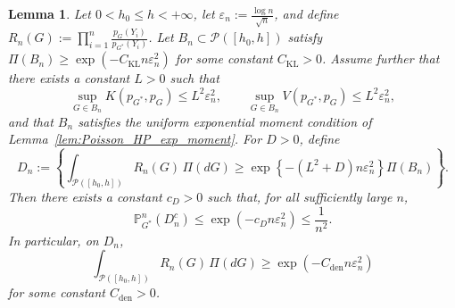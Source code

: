\documentclass[twoside,12pt]{article}
\renewcommand{\P}{\mathds{P}}
\newtheorem{lem}[thm]{Lemma}
\begin{document}
\begin{lem}\label{lem:Poisson_HP_Dn}
Let $0<h_0\le h<+\infty$, let $\varepsilon_n:=\frac{\log n}{\sqrt n}$, and define $R_n(G):=\prod_{i=1}^n \frac{p_G(Y_i)}{p_{G^\ast}(Y_i)}$. Let $B_n\subset \mathcal P([h_{0},h])$ satisfy $\Pi(B_n)\ge \exp(-C_{\mathrm{KL}}n\varepsilon_n^2)$ for some constant $C_{\mathrm{KL}}>0$. Assume further that there exists a constant $L>0$ such that
\begin{displaymath}
\sup_{G\in B_n}K(p_{G^\ast},p_G)\le L^2\varepsilon_n^2,\qquad\sup_{G\in B_n}V(p_{G^\ast},p_G)\le L^2\varepsilon_n^2,
\end{displaymath}
and that $B_n$ satisfies the uniform exponential moment condition of Lemma~\ref{lem:Poisson_HP_exp_moment}. For $D>0$, define
\begin{displaymath}
D_n:=\left\{\int_{\mathcal P([h_{0},h])} R_n(G)\,\Pi(dG)\ge\exp\!\left\{-(L^2+D)n\varepsilon_n^2\right\}\Pi(B_n)\right\}.
\end{displaymath}
Then there exists a constant $c_D>0$ such that, for all sufficiently large $n$,
\begin{displaymath}
\P_{G^\ast}^n(D_n^c)\le\exp(-c_D n\varepsilon_n^2)\le\frac{1}{n^2}.
\end{displaymath}
In particular, on $D_n$,
\begin{displaymath}
\int_{\mathcal P([h_{0},h])} R_n(G)\,\Pi(dG)\ge\exp(-C_{\mathrm{den}}n\varepsilon_n^2)
\end{displaymath}
for some constant $C_{\mathrm{den}}>0$.
\end{lem}
\end{document}
